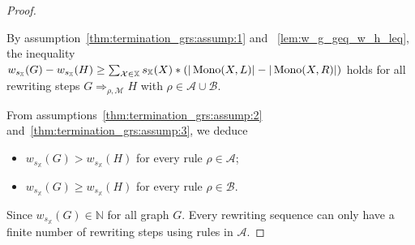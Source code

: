 
\begin{proof}
    \label{proof:thm:termination_grs}
    
    By assumption~\eqref{thm:termination_grs:assump:1} and ~\autoref{lem:w_g_geq_w_h_leq}, the inequality \(
        w_{s_\mathbb{X}}(G) - w_{s_\mathbb{X}}(H) 
        \geq 
        \sum_{\mathcal{X} \in \mathbb{X}}^{}s_\mathbb{X}(X) * \left( 
            |\operatorname{Mono}(X,L)| -
            |\operatorname{Mono}(X,R)|
            \right)
    \) holds for all rewriting steps $G \Rightarrow_{\rho, \mathcal{M}} H$  with $\rho \in \mathcal{A} \cup \mathcal{B}$.
    
    \noindent From assumptions~\eqref{thm:termination_grs:assump:2} and~\eqref{thm:termination_grs:assump:3}, we deduce 
    \begin{itemize}
        \item \( w_{s_\mathbb{X}}(G) > w_{s_\mathbb{X}}(H) \) for every rule \(\rho \in \mathcal{A}\);
        \item  \( w_{s_\mathbb{X}}(G) \geq w_{s_\mathbb{X}}(H) \) for every rule \(\rho \in \mathcal{B}\).
    \end{itemize}
    Since $w_{s_\mathbb{X}}(G) \in \mathbb{N}$ for all graph $G$. Every rewriting sequence can only have a finite number of rewriting steps using rules in $\mathcal{A}$.
\end{proof} 